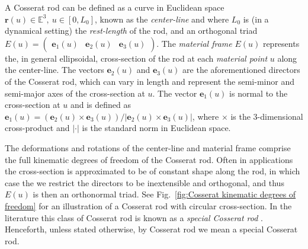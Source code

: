 A Cosserat rod can be defined as a curve in Euclidean space $\mathbf{r}(u) \in \mathbb{E}^3,\ u \in [0, L_0]$, known as the \textit{center-line} and where $L_0$ is (in a dynamical setting) the \textit{rest-length} of the rod, and an orthogonal triad $E(u) = \begin{pmatrix} \mathbf{e}_1(u) & \mathbf{e}_2(u) & \mathbf{e}_3(u) \end{pmatrix}$. The \textit{material frame} $E(u)$ represents the, in general ellipsoidal, cross-section of the rod at each \textit{material point} $u$ along the center-line. The vectors $\mathbf{e}_2(u)$ and $\mathbf{e}_3(u)$ are the aforementioned directors of the Cosserat rod, which can vary in length and represent the semi-minor and semi-major axes of the cross-section at $u$. The vector $\mathbf{e}_1(u)$ is normal to the cross-section at $u$ and is defined as $\mathbf{e}_1(u) = (\mathbf{e}_2(u) \times \mathbf{e}_3(u)) / |\mathbf{e}_2(u) \times \mathbf{e}_3(u)|$, where $\times$ is the 3-dimensional cross-product and $|\cdot|$ is the standard norm in Euclidean space.

The deformations and rotations of the center-line and material frame comprise the full kinematic degrees of freedom of the Cosserat rod. Often in applications the cross-section is approximated to be of constant shape along the rod, in which case the we restrict the directors to be inextensible and orthogonal, and thus $E(u)$ is then an orthonormal triad. See Fig.~\ref{fig:Cosserat kinematic degrees of freedom} for an illustration of a Cosserat rod with circular cross-section. In the literature this class of Cosserat rod is known as a \textit{special Cosserat rod} \citep{antmanSpecialCosseratTheory1995, rubinCosseratRods2000, altenbachCosseratMedia2013}. Henceforth, unless stated otherwise, by Cosserat rod we mean a special Cosserat rod.

